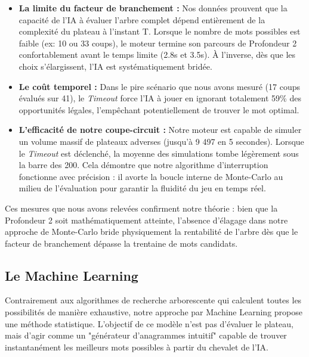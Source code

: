 \documentclass[a4paper]{article}
\begin{document}
    \begin{itemize}
        \item \textbf{La limite du facteur de branchement :} Nos données prouvent que la capacité de l'IA à évaluer l'arbre complet dépend entièrement de la complexité du plateau à l'instant T. Lorsque le nombre de mots possibles est faible (ex: 10 ou 33 coups), le moteur termine son parcours de Profondeur 2 confortablement avant le temps limite (2.8s et 3.5s). À l'inverse, dès que les choix s'élargissent, l'IA est systématiquement bridée.
        \item \textbf{Le coût temporel :} Dans le pire scénario que nous avons mesuré (17 coups évalués sur 41), le \textit{Timeout} force l'IA à jouer en ignorant totalement 59\% des opportunités légales, l'empêchant potentiellement de trouver le mot optimal.
        \item \textbf{L'efficacité de notre coupe-circuit :} Notre moteur est capable de simuler un volume massif de plateaux adverses (jusqu'à 9 497 en 5 secondes). Lorsque le \textit{Timeout} est déclenché, la moyenne des simulations tombe légèrement sous la barre des 200. Cela démontre que notre algorithme d'interruption fonctionne avec précision : il avorte la boucle interne de Monte-Carlo au milieu de l'évaluation pour garantir la fluidité du jeu en temps réel.
    \end{itemize}

    Ces mesures que nous avons relevées confirment notre théorie : bien que la Profondeur 2 soit mathématiquement atteinte, l'absence d'élagage dans notre approche de Monte-Carlo bride physiquement la rentabilité de l'arbre dès que le facteur de branchement dépasse la trentaine de mots candidats.

    \subsection{Le Machine Learning}

    Contrairement aux algorithmes de recherche arborescente qui calculent toutes les possibilités de manière exhaustive, notre approche par Machine Learning propose une méthode statistique. L'objectif de ce modèle n'est pas d'évaluer le plateau, mais d'agir comme un "générateur d'anagrammes intuitif" capable de trouver instantanément les meilleurs mots possibles à partir du chevalet de l'IA.
\end{document}
